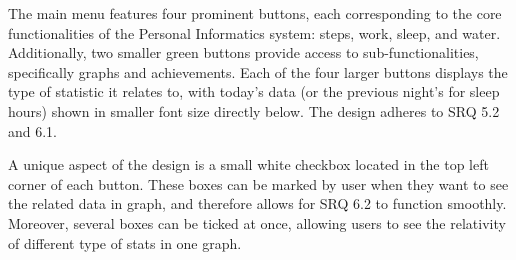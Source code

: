 \documentclass[11pt]{article}
\begin{document}
The main menu features four prominent buttons, each corresponding to the core 
functionalities of the Personal Informatics system: steps, work, sleep, and water.
Additionally, two smaller green buttons provide access to sub-functionalities, 
specifically graphs and achievements. Each of the four larger buttons displays 
the type of statistic it relates to, with today's data (or the previous night's
for sleep hours) shown in smaller font size directly below. The design adheres to SRQ 5.2 and 6.1.\par

A unique aspect of the design is a small white checkbox located in the top left
corner of each button. These boxes can be marked by user when they want to see
the related data in graph, and therefore allows for SRQ 6.2 to function smoothly.
Moreover, several boxes can be ticked at once, allowing users to see the relativity of different type of stats in one graph.\par
\end{document}
